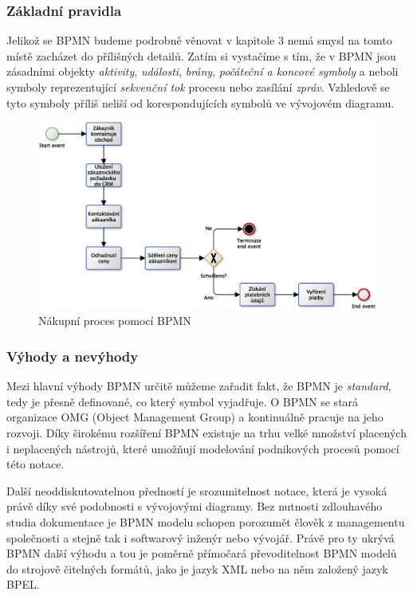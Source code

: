\subsubsection{Základní pravidla}
Jelikož se BPMN budeme podrobně věnovat v kapitole 3 %
nemá smysl na tomto místě zacházet do přílišných detailů. Zatím si vystačíme s tím, že v BPMN jsou zásadními objekty \textit{aktivity}, \textit{události}, \textit{brány}, \textit{počáteční a koncové symboly} a \textit{} neboli symboly reprezentující \textit{sekvenční tok} procesu nebo zasílání \textit{zpráv}. Vzhledově se tyto symboly příliš neliší od korespondujících  symbolů ve vývojovém diagramu.

\begin{figure}[H]\centering 
\includegraphics[width=1.0\textwidth]{obrazky/bpmn-order-process}
\caption{Nákupní proces pomocí BPMN}
\label{fig:BPMN_nakupniproces}
\end{figure}

\subsubsection{Výhody a nevýhody}
Mezi hlavní výhody BPMN určitě můžeme zařadit fakt, že BPMN je \textit{standard}, tedy je přesně definované, co který symbol vyjadřuje. O BPMN se stará organizace OMG (Object Management Group) a kontinuálně pracuje na jeho rozvoji. Díky širokému rozšíření BPMN existuje na trhu velké množství placených i neplacených nástrojů, které umožňují modelování podnikových procesů pomocí této notace.

Další neoddiskutovatelnou předností je srozumitelnost notace, která je vysoká právě díky své podobnosti s vývojovými diagramy. Bez nutnosti zdlouhavého studia dokumentace je BPMN modelu schopen porozumět člověk z managementu společnosti a stejně tak i softwarový inženýr nebo vývojář. Právě pro ty ukrývá BPMN další výhodu a tou je poměrně přímočará převoditelnost BPMN modelů do strojově čitelných formátů, jako je jazyk XML nebo na něm založený jazyk BPEL. %

